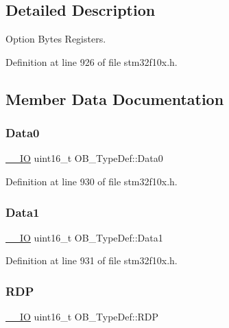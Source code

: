 \subsection{Detailed Description}
Option Bytes Registers. 

Definition at line 926 of file stm32f10x.\+h.



\subsection{Member Data Documentation}
\mbox{\label{struct_o_b___type_def_a7570c0ba4b4d31c6061d595279e6b36e}} 
\subsubsection{\texorpdfstring{Data0}{Data0}}
{\footnotesize\ttfamily \hyperlink{core__sc300_8h_aec43007d9998a0a0e01faede4133d6be}{\+\_\+\+\_\+\+IO} uint16\+\_\+t O\+B\+\_\+\+Type\+Def\+::\+Data0}



Definition at line 930 of file stm32f10x.\+h.

\mbox{\label{struct_o_b___type_def_a4e0e4a89db7004fb08a8a19129e9970e}} 
\subsubsection{\texorpdfstring{Data1}{Data1}}
{\footnotesize\ttfamily \hyperlink{core__sc300_8h_aec43007d9998a0a0e01faede4133d6be}{\+\_\+\+\_\+\+IO} uint16\+\_\+t O\+B\+\_\+\+Type\+Def\+::\+Data1}



Definition at line 931 of file stm32f10x.\+h.

\mbox{\label{struct_o_b___type_def_ad9f9ae594003c39cc27f147e29a130bb}} 
\subsubsection{\texorpdfstring{R\+DP}{RDP}}
{\footnotesize\ttfamily \hyperlink{core__sc300_8h_aec43007d9998a0a0e01faede4133d6be}{\+\_\+\+\_\+\+IO} uint16\+\_\+t O\+B\+\_\+\+Type\+Def\+::\+R\+DP}



